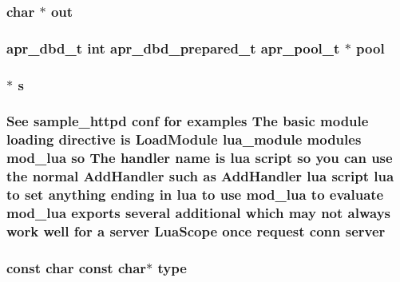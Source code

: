 \subsubsection[{\texorpdfstring{out}{out}}]{ char $\ast$ out}\hypertarget{group__APACHE__CORE__MUTEX_gac9982b93474ad913f3fcbdcff95accf4}{}\label{group__APACHE__CORE__MUTEX_gac9982b93474ad913f3fcbdcff95accf4}
\subsubsection[{\texorpdfstring{pool}{pool}}]{ {\bf apr\+\_\+dbd\+\_\+t} {\bf int} {\bf apr\+\_\+dbd\+\_\+prepared\+\_\+t} {\bf apr\+\_\+pool\+\_\+t} $\ast$ pool}\hypertarget{group__APACHE__CORE__MUTEX_ga8fea43b485988aa6df5dced9dddbe733}{}\label{group__APACHE__CORE__MUTEX_ga8fea43b485988aa6df5dced9dddbe733}
\subsubsection[{\texorpdfstring{s}{s}}]{$\ast$ s}\hypertarget{group__APACHE__CORE__MUTEX_gac4d70082e9974ebc2dabf813f28a90e6}{}\label{group__APACHE__CORE__MUTEX_gac4d70082e9974ebc2dabf813f28a90e6}
\subsubsection[{\texorpdfstring{server}{server}}]{\setlength{\rightskip}{0pt plus 5cm}See sample\+\_\+httpd {\bf conf} for examples The basic {\bf module} loading {\bf directive} {\bf is} Load\+Module {\bf lua\+\_\+module} modules mod\+\_\+lua {\bf so} The {\bf handler} {\bf name} {\bf is} lua {\bf script} {\bf so} you {\bf can} use the normal Add\+Handler such {\bf as} Add\+Handler lua {\bf script} lua {\bf to} {\bf set} anything ending {\bf in} lua {\bf to} use mod\+\_\+lua {\bf to} evaluate mod\+\_\+lua exports several additional {\bf which} may {\bf not} always work well for {\bf a} server Lua\+Scope {\bf once} {\bf request} {\bf conn} server}\hypertarget{group__APACHE__CORE__MUTEX_ga32727ee32089d3426d1d6a7280d28228}{}\label{group__APACHE__CORE__MUTEX_ga32727ee32089d3426d1d6a7280d28228}
\subsubsection[{\texorpdfstring{type}{type}}]{\setlength{\rightskip}{0pt plus 5cm}const char const char$\ast$ type}\hypertarget{group__APACHE__CORE__MUTEX_gad6684d21de09ea5d0d54e7629c882107}{}\label{group__APACHE__CORE__MUTEX_gad6684d21de09ea5d0d54e7629c882107}
